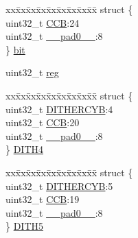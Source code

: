 \begin{DoxyCompactItemize}
\begin{tabbing}
\end{tabbing}\item 
\begin{tabbing}
xx\=xx\=xx\=xx\=xx\=xx\=xx\=xx\=xx\=\kill
struct \{\\
\>uint32\_t \mbox{\hyperlink{union_t_c_c___c_c_b___type_a01afc958e04cff1d06806b323d21d694}{CCB}}:24\\
\>uint32\_t \mbox{\hyperlink{union_t_c_c___c_c_b___type_a3e57c2ef1c3ffb36722f000cc1156824}{\_\_pad0\_\_}}:8\\
\} \mbox{\hyperlink{union_t_c_c___c_c_b___type_aced41115990a4c24baf44581e8d8c6c5}{bit}}\\

\end{tabbing}\item 
uint32\+\_\+t \mbox{\hyperlink{union_t_c_c___c_c_b___type_a6b91636401516a477989a336376d7b40}{reg}}
\item 
\begin{tabbing}
xx\=xx\=xx\=xx\=xx\=xx\=xx\=xx\=xx\=\kill
struct \{\\
\>uint32\_t \mbox{\hyperlink{union_t_c_c___c_c_b___type_a156fbeb3ca1ed9f6622afd99724ad24c}{DITHERCYB}}:4\\
\>uint32\_t \mbox{\hyperlink{union_t_c_c___c_c_b___type_a01afc958e04cff1d06806b323d21d694}{CCB}}:20\\
\>uint32\_t \mbox{\hyperlink{union_t_c_c___c_c_b___type_a3e57c2ef1c3ffb36722f000cc1156824}{\_\_pad0\_\_}}:8\\
\} \mbox{\hyperlink{union_t_c_c___c_c_b___type_a11f75520ad033604b2cb42a53e9afb34}{DITH4}}\\

\end{tabbing}\item 
\begin{tabbing}
xx\=xx\=xx\=xx\=xx\=xx\=xx\=xx\=xx\=\kill
struct \{\\
\>uint32\_t \mbox{\hyperlink{union_t_c_c___c_c_b___type_a156fbeb3ca1ed9f6622afd99724ad24c}{DITHERCYB}}:5\\
\>uint32\_t \mbox{\hyperlink{union_t_c_c___c_c_b___type_a01afc958e04cff1d06806b323d21d694}{CCB}}:19\\
\>uint32\_t \mbox{\hyperlink{union_t_c_c___c_c_b___type_a3e57c2ef1c3ffb36722f000cc1156824}{\_\_pad0\_\_}}:8\\
\} \mbox{\hyperlink{union_t_c_c___c_c_b___type_aec4c6952b37c27ccaaa6264ed127a201}{DITH5}}\\


\end{tabbing}
\end{DoxyCompactItemize}
